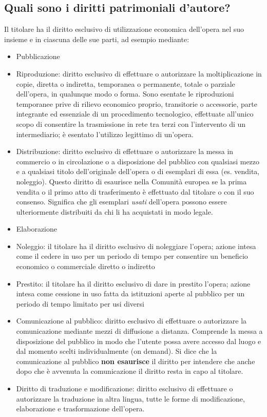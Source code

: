 \subsection{Quali sono i diritti patrimoniali d'autore?}
Il titolare ha il diritto esclusivo di utilizzazione economica dell'opera nel suo insieme
e in ciascuna delle sue parti, ad esempio mediante:
\begin{itemize}
    \item Pubblicazione
    \item Riproduzione: diritto esclusivo di effettuare o autorizzare la moltiplicazione in copie, diretta o indiretta,
    temporanea o permanente, totale o parziale dell'opera, in qualunque modo o forma. \newline
    Sono esentate le riproduzioni temporanee prive di rilievo economico proprio, transitorie o accessorie,
    parte integrante ed essenziale di un procedimento tecnologico, effettuate all'unico scopo di consentire la trasmissione in rete tra terzi
    con l'intervento di un intermediario; è esentato l'utilizzo legittimo di un'opera.
    \item Distribuzione: diritto esclusivo di effettuare o autorizzare la messa in commercio o in circolazione
    o a disposizione del pubblico con qualsiasi mezzo e a qualsiasi titolo dell'originale dell'opera o di esemplari
    di essa (es. vendita, noleggio).\newline
    Questo diritto di esaurisce nella Comunità europea se la prima vendita o il primo atto di trasferimento è effettuato
    dal titolare o con il suo consenso. Significa che gli esemplari \textit{usati} dell'opera possono essere ulteriormente
    distribuiti da chi li ha acquistati in modo legale.
    \item Elaborazione
    \item Noleggio: il titolare ha il diritto esclusivo di noleggiare l'opera; azione intesa come il cedere in uso per
    un periodo di tempo per consentire un beneficio economico o commerciale diretto o indiretto
    \item Prestito: il titolare ha il diritto esclusivo di dare in prestito l'opera; azione intesa come cessione in uso fatta
    da istituzioni aperte al pubblico per un periodo di tempo limitato per usi diversi
    \item Comunicazione al pubblico: diritto esclusivo di effettuare o autorizzare la comunicazione mediante
    mezzi di diffusione a distanza. Comprende la messa a disposizione del pubblico in modo che l'utente possa avere
    accesso dal luogo e dal momento scelti individualmente (on demand).\newline
    Si dice che la comunicazione al pubblico \textbf{non esaurisce} il diritto per intendere che anche dopo
    che è avvenuta la comunicazione il diritto resta in capo al titolare.
    \item Diritto di traduzione e modificazione: diritto esclusivo di effettuare o autorizzare la traduzione in
    altra lingua, tutte le forme di modificazione, elaborazione e trasformazione dell'opera.
\end{itemize}

